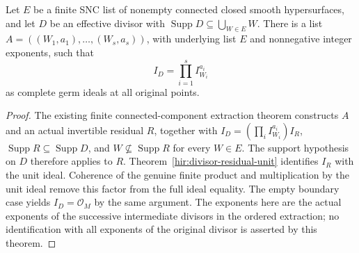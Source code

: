 \begin{theorem}
\label{hir:divisor-supported-finite-monomial}
\leanok
Let $E$ be a finite SNC list of nonempty connected closed smooth
hypersurfaces, and let $D$ be an effective divisor with
$\operatorname{Supp}D\subseteq\bigcup_{W\in E}W$.
There is a list $A=((W_1,a_1),\ldots,(W_s,a_s))$, with underlying list
$E$ and nonnegative integer exponents, such that
\[
 I_D=\prod_{i=1}^s I_{W_i}^{a_i}
\]
as complete germ ideals at all original points.
\end{theorem}
\begin{proof}
The existing finite connected-component extraction theorem constructs
$A$ and an actual invertible residual $R$, together with
$I_D=(\prod_i I_{W_i}^{a_i})I_R$,
$\operatorname{Supp}R\subseteq\operatorname{Supp}D$, and
$W\not\subseteq\operatorname{Supp}R$ for every $W\in E$.
The support hypothesis on $D$ therefore applies to $R$.
Theorem~\ref{hir:divisor-residual-unit} identifies $I_R$ with the unit
ideal.  Coherence of the genuine finite product and multiplication by
the unit ideal remove this factor from the full ideal equality.
The empty boundary case yields $I_D=\mathcal O_M$ by the same argument.
The exponents here are the actual exponents of the successive
intermediate divisors in the ordered extraction; no identification
with all exponents of the original divisor is asserted by this theorem.
\end{proof}
